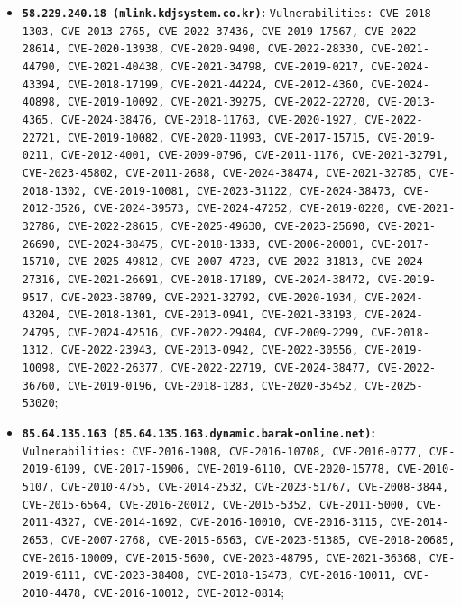 \documentclass[12pt]{article}
\begin{document}
\begin{itemize}
  \item \textbf{\texttt{58.229.240.18 (mlink.kdjsystem.co.kr)}:} \texttt{Vulnerabilities: CVE-2018-1303, CVE-2013-2765, CVE-2022-37436, CVE-2019-17567, CVE-2022-28614, CVE-2020-13938, CVE-2020-9490, CVE-2022-28330, CVE-2021-44790, CVE-2021-40438, CVE-2021-34798, CVE-2019-0217, CVE-2024-43394, CVE-2018-17199, CVE-2021-44224, CVE-2012-4360, CVE-2024-40898, CVE-2019-10092, CVE-2021-39275, CVE-2022-22720, CVE-2013-4365, CVE-2024-38476, CVE-2018-11763, CVE-2020-1927, CVE-2022-22721, CVE-2019-10082, CVE-2020-11993, CVE-2017-15715, CVE-2019-0211, CVE-2012-4001, CVE-2009-0796, CVE-2011-1176, CVE-2021-32791, CVE-2023-45802, CVE-2011-2688, CVE-2024-38474, CVE-2021-32785, CVE-2018-1302, CVE-2019-10081, CVE-2023-31122, CVE-2024-38473, CVE-2012-3526, CVE-2024-39573, CVE-2024-47252, CVE-2019-0220, CVE-2021-32786, CVE-2022-28615, CVE-2025-49630, CVE-2023-25690, CVE-2021-26690, CVE-2024-38475, CVE-2018-1333, CVE-2006-20001, CVE-2017-15710, CVE-2025-49812, CVE-2007-4723, CVE-2022-31813, CVE-2024-27316, CVE-2021-26691, CVE-2018-17189, CVE-2024-38472, CVE-2019-9517, CVE-2023-38709, CVE-2021-32792, CVE-2020-1934, CVE-2024-43204, CVE-2018-1301, CVE-2013-0941, CVE-2021-33193, CVE-2024-24795, CVE-2024-42516, CVE-2022-29404, CVE-2009-2299, CVE-2018-1312, CVE-2022-23943, CVE-2013-0942, CVE-2022-30556, CVE-2019-10098, CVE-2022-26377, CVE-2022-22719, CVE-2024-38477, CVE-2022-36760, CVE-2019-0196, CVE-2018-1283, CVE-2020-35452, CVE-2025-53020};
  \item \textbf{\texttt{85.64.135.163 (85.64.135.163.dynamic.barak-online.net)}:} \texttt{Vulnerabilities: CVE-2016-1908, CVE-2016-10708, CVE-2016-0777, CVE-2019-6109, CVE-2017-15906, CVE-2019-6110, CVE-2020-15778, CVE-2010-5107, CVE-2010-4755, CVE-2014-2532, CVE-2023-51767, CVE-2008-3844, CVE-2015-6564, CVE-2016-20012, CVE-2015-5352, CVE-2011-5000, CVE-2011-4327, CVE-2014-1692, CVE-2016-10010, CVE-2016-3115, CVE-2014-2653, CVE-2007-2768, CVE-2015-6563, CVE-2023-51385, CVE-2018-20685, CVE-2016-10009, CVE-2015-5600, CVE-2023-48795, CVE-2021-36368, CVE-2019-6111, CVE-2023-38408, CVE-2018-15473, CVE-2016-10011, CVE-2010-4478, CVE-2016-10012, CVE-2012-0814};

\end{itemize}
\end{document}
